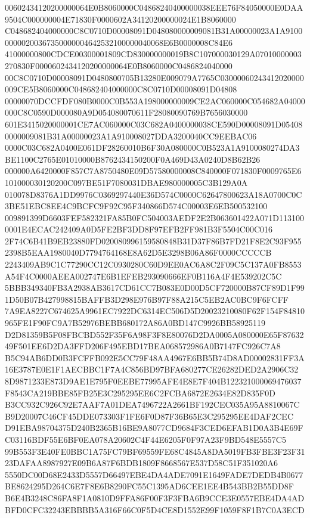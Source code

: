 \documentclass[UTF8,fontset=fandol,zihao=-4,a4paper]{ctexart}
\begin{document}
{{00602434120200000064E0B8060000C04868240400000038EEE76F84050000E0DAA9504C000000004E71830F0000602A34120200000024E1B8060000
C048682404000000C8C0710D00008091D048080000009081B31A00000023A1A910000000200367350000004642532100000040068E6B0000008C84E6
41000000800CDCE00300001809CD830000000019B8C107000030129A07010000003270830F0000602434120200000064E0B8060000C0486824040000
00C8C0710D00008091D0480800705B13280E009079A7765C03000060243412020000009CE5B8060000C048682404000000C8C0710D00008091D04808
00000070DCCFDF080B0000C0B553A198000000009CE2AC060000C054682A04000000C8C0590D000080A9D054080070611F28080090769B7656030000
601E3415020000001CE7AC060000C03C682A0400000038CE590D00008091D054080000009081B31A00000023A1A910008027DDA3200040CC9EEBAC06
0000C03C682A0400E061DF28260010B6F30A080000C0B523A1A9100080274DA3BE1100C2765E01010000B8762434150200F0A469D43A0240D8B62B26
000000A6420000F857C7A8750480E09D57580000008C840000F071830F0009765E6101000030120200C097BE51F7080031DBAE980000005C3B129A0A
010078D8376A1DD9976C0369297440E36D574C0000C62647800623A18A0700C0C3BE51EBC8EE4C9BCFC9F92C95F340866D574C00003E6EB500532100
009891399D6603FEF582321FA85B0FC504003AEDF2E2B063601422A071D1131000001E4ECAC242409A0D5FE2BF3DD8F97EFB2FF981B3F5504C00C016
2F74C6B41B9EB23880FD020080996159580848B31D37F86B7FD21F8E2C93F9552398B5EAA1980040D7794764168E8A62D5E3298B06A86F0000CCCCCB
2243409AB9C1C77290CC12C0930280C60D9EE0AC6A8C2F09C5C137A0FB8553A54F4C0000AEEA002747E6B1EFEB293090666EF0B116A4F4E539202C5C
5BBB349340FB3A2938AB3617CD61CC7B083E0D00D5CF720000B87CF89D1F991D50B07B427998815BAFFB3D298E976B97F88A215C5EB2AC0BC9F6FCFF
7A9EA8227C674625A9961EC7922DC6314EC506D5D20023210080F62F154F84810965FE1F90FC9A7B52976BEBB680172A86A0BD147C9926BB58925119
D2D81359B5F08FBCBD552F35F6A98F3F8E80076D2DA0005A080000E65F8763249F501EE6D2DA3FFD206F495EBD17BEA068572986A0B7147FC926C7A8
B5C94AB6DD0B3FCFFB092E5CC79F48AA4967E6BB5B74D8AD00002831FF3A16E3787E0E1F1AECBBC1F7A4C856BD97BFA680277CE26282DED2A2906C32
8D9871233E873D9AE1E795F0EEBE77995AFE4E8E7F404B122321000069476037F8543CA219BBE85FB25E3C295295EE6C2FCBA6872E2634E82D835F0D
B3CC932C926C92E7AAF7A01DEA7496722A2661BF192CEC035A95A8810067CB9D20007C46CF45DDE073303F1FE6F0D87F36B65E3C295295EE4DAF2CEC
D91EBA98704375D240B2365B16BE9A8077CD9684F3CED6EFAB1D0A3B4E69FC03116BDF55E6BF0EA078A20602C4F44E6205F0F97A23F9BD548E5557C5
99B553F3E40FE0BBC1A75FC79BF69559FE68C4845A8DA5019FB3FBE3F23F3123DAFAA8987927E09B6A87F6BDB1809F8668567E537D58C51F351020A6
5550DC00D68E2433D5557D66497EBE4DA4ADE7091E1649FADE7DEDB4B0677BE8624295D264C6E7F8E6B8290FC55C1395AD6CEE1EE4B543BB2B55DD8F
B6E4B3248C86FA8F1A0810D9FFA86F00F3F3FBA6B9CCE3E0557EBE4DA4ADBFD0CFC32243EBBBB5A316F66C0F5D4CE8D1552E99F1059F8F1B7C0A3ECD
}}
\end{document}
